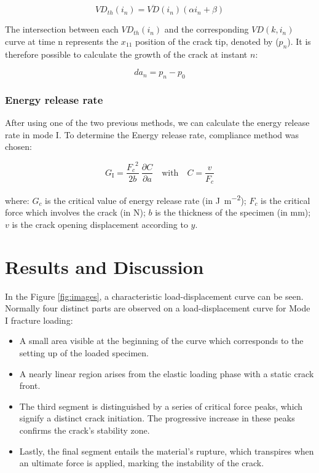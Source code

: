 \documentclass[3p,times,procedia]{elsarticle}
\begin{document}
\begin{equation}
	VD_{th}(i_n)=\overline{VD}(i_n)(\alpha i_n +\beta)
	\label{eq:eq26}
\end{equation}

The intersection between each $VD_{th}(i_n)$ and the corresponding $VD(k, i_n)$ curve at time n represents the $x_{11}$ position of the crack tip, denoted by ($p_n$).
It is therefore possible to calculate the growth of the crack at instant $n$:

\begin{equation}
	da_n=p_n-p_0
	\label{eq:eq27}
\end{equation}

\subsubsection{Energy release rate}

After using one of the two previous methods, we can calculate the energy release rate in mode I. To determine the Energy release rate, compliance method was chosen:

\begin{equation}
	G_\text{I}=\displaystyle\frac{{F_{c}}^2}{2b}\ \frac{\partial C}{\partial a} \quad \text{with} \quad C=\frac{v}{F_{c}} 	
	\label{eq:Energy release rate equation}
\end{equation} 
 
\noindent where: $G_c$ is the critical value of energy release rate (in \si{\joule\per\square\meter}); $F_c$ is the critical force which involves the crack (in \si{\newton}); $b$ is the thickness of the specimen (in \si{\milli\meter}); $v$ is the crack opening displacement according to $y$.


\section{Results and Discussion}\label{S:res}


In the Figure \ref{fig:images}, a characteristic load-displacement curve can be seen. Normally four distinct parts are observed on a load-displacement curve for Mode I fracture loading:

\begin{itemize}
	\item A small area visible at the beginning of the curve which corresponds to the setting up of the loaded specimen. 
	\item A nearly linear region arises from the elastic loading phase with a static crack front.
	\item The third segment is distinguished by a series of critical force peaks, which signify a distinct crack initiation. The progressive increase in these peaks confirms the crack's stability zone.
	\item Lastly, the final segment entails the material's rupture, which transpires when an ultimate force is applied, marking the instability of the crack.
\end{itemize}
\end{document}
